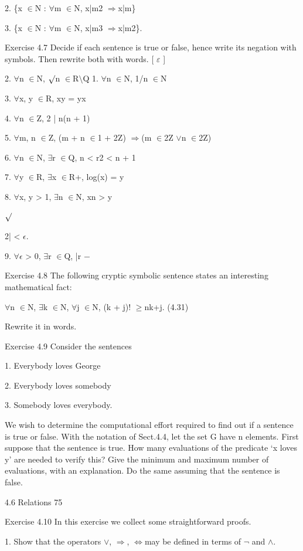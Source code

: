 \documentclass[11pt]{article}
\theoremstyle{plain}
\theoremstyle{definition}
\begin{document}
2. \{x $\in$N : $\forall$m $\in$N, x|m2 $\Rightarrow$x|m\}

3. \{x $\in$N : $\forall$m $\in$N, x|m3 $\Rightarrow$x|m2\}.

Exercise 4.7 Decide if each sentence is true or false, hence write its negation with symbols. Then rewrite both with words. [ $\varepsilon$ ]

2. $\forall$n $\in$N, $\surd$n $\in$R$\setminus$Q 1. $\forall$n $\in$N, 1/n $\in$N

3. $\forall$x, y $\in$R, xy = yx

4. $\forall$n $\in$Z, 2 | n(n + 1)

5. $\forall$m, n $\in$Z, (m + n $\in$1 + 2Z) $\Rightarrow$(m $\in$2Z $\lor$n $\in$2Z)

6. $\forall$n $\in$N, $\exists$r $\in$Q, n < r2 < n + 1

7. $\forall$y $\in$R, $\exists$x $\in$R+, log(x) = y

8. $\forall$x, y > 1, $\exists$n $\in$N, xn > y

$\surd$

2| < $\epsilon$.

9. $\forall$$\epsilon$ > 0, $\exists$r $\in$Q, |r $-$

Exercise 4.8 The following cryptic symbolic sentence states an interesting mathematical fact:

$\forall$n $\in$N, $\exists$k $\in$N, $\forall$j $\in$N, (k + j)! $\geq$nk+j. (4.31)

Rewrite it in words.

Exercise 4.9 Consider the sentences

1. Everybody loves George

2. Everybody loves somebody

3. Somebody loves everybody.

We wish to determine the computational effort required to find out if a sentence is true or false. With the notation of Sect.4.4, let the set G have n elements. First suppose that the sentence is true. How many evaluations of the predicate `x loves y' are needed to verify this? Give the minimum and maximum number of evaluations, with an explanation. Do the same assuming that the sentence is false.

4.6 Relations 75

Exercise 4.10 In this exercise we collect some straightforward proofs.

1. Show that the operators $\lor$, $\Rightarrow$, $\Leftrightarrow$may be defined in terms of $\neg$ and $\land$.
\end{document}
